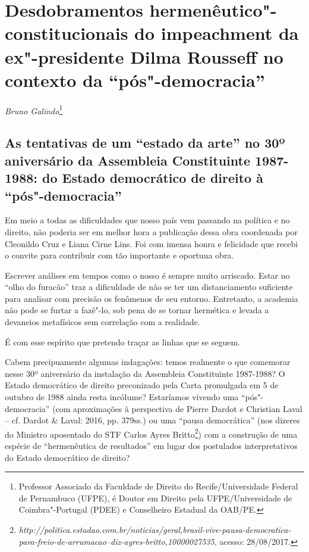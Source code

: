 \chapter{Desdobramentos hermenêutico"-constitucionais do
impeachment da ex"-presidente Dilma Rousseff no contexto da
``pós"-democracia''}

\begin{flushright}
\emph{Bruno Galindo}\footnote{Professor Associado da Faculdade de Direito do Recife/Universidade
Federal de Pernambuco (UFPE), é
Doutor em Direito pela UFPE/Universidade de Coimbra"-Portugal
(PDEE) e Conselheiro Estadual da OAB/PE.}
\end{flushright}


 \section{As tentativas de um ``estado da arte'' no 30º aniversário da
  Assembleia Constituinte 1987-1988: do Estado democrático de direito à
  ``pós"-democracia''}


Em meio a todas as dificuldades que nosso país vem passando na política
e no direito, não poderia ser em melhor hora a publicação dessa obra
coordenada por Cleonildo Cruz e Liana Cirne Lins. Foi com imensa honra e
felicidade que recebi o convite para contribuir com tão importante e
oportuna obra.

Escrever análises em tempos como o nosso é sempre muito arriscado. Estar
no ``olho do furacão'' traz a dificuldade de não se ter um
distanciamento suficiente para analisar com precisão os fenômenos de seu
entorno. Entretanto, a academia não pode se furtar a fazê"-lo, sob pena
de se tornar hermética e levada a devaneios metafísicos sem correlação
com a realidade.

É com esse espírito que pretendo traçar as linhas que se seguem.

Cabem precipuamente algumas indagações: temos realmente o que comemorar
nesse 30º aniversário da instalação da Assembleia Constituinte
1987-1988? O Estado democrático de direito preconizado pela Carta
promulgada em 5 de outubro de 1988 ainda resta incólume? Estaríamos
vivendo uma ``pós"-democracia'' (com aproximações à perspectiva de Pierre
Dardot e Christian Laval -- cf. Dardot \& Laval: 2016, pp. 379ss.) ou
uma ``pausa democrática'' (nos dizeres do Ministro aposentado do STF
Carlos Ayres Britto\footnote{\emph{http://politica.estadao.com.br/noticias/geral,brasil-vive-pausa-democratica-para-freio-de-arrumacao--diz-ayres-britto,10000027535},
  acesso: 28/08/2017.}) com a construção de uma espécie de
``hermenêutica de resultados'' em lugar dos postulados interpretativos
do Estado democrático de direito?

